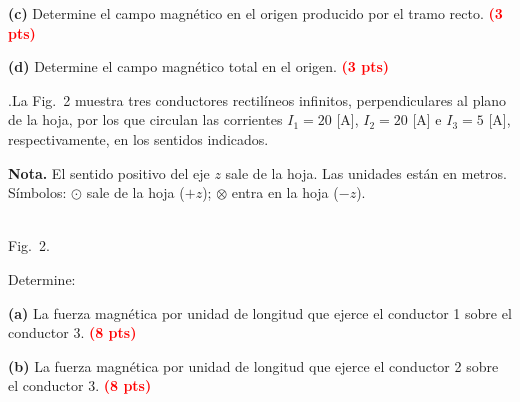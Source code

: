 \documentclass[addpoints,12pt]{exam}
\newcommand{\qpts}[1]{{\setlength{\fboxsep}{2.5pt}\fbox{#1}}\hspace{0.6em}\ignorespaces}
\newcommand{\qhead}[1]{\thequestion.\hspace{0.5em}\qpts{#1}}
\newcommand{\pts}[1]{\textcolor{red}{\textbf{(#1 pts)}}}
\newcommand{\isale}[1]{%
  \draw[ubbblue,line width=1.4pt,fill=white] (#1) circle (0.2);
  \fill[ubbblue] (#1) circle (0.075);}
\newcommand{\ientra}[1]{%
  \draw[ubbblue,line width=1.4pt,fill=white] (#1) circle (0.2);
  \draw[ubbblue,line width=1.4pt] ($(#1)+(-0.13,-0.13)$)--($(#1)+(0.13,0.13)$)
        ($(#1)+(-0.13,0.13)$)--($(#1)+(0.13,-0.13)$);}
\begin{document}
\begin{questions}
\vspace{7.5cm}
\noindent\textbf{(c)} Determine el campo magn\'etico en el origen producido por el tramo recto.
\pts{3}

\vspace{3.5cm}
\noindent\textbf{(d)} Determine el campo magn\'etico total en el origen. \pts{3}

\newpage

\question[20]
\begin{minipage}[t]{0.56\textwidth}
\vspace{0pt}
\qhead{20}La Fig.~2 muestra
tres conductores rectil\'ineos infinitos, perpendiculares al plano de la hoja, por los que circulan
las corrientes $I_1 = 20$ [A], $I_2 = 20$ [A] e $I_3 = 5$ [A], respectivamente, en los sentidos indicados.

\smallskip
\noindent\textbf{Nota.} El sentido positivo del eje $z$ sale de la hoja. Las unidades est\'an en
metros. S\'imbolos: $\odot$ sale de la hoja ($+z$); $\otimes$ entra en la hoja ($-z$).
\end{minipage}\hfill
\begin{minipage}[t]{0.40\textwidth}
\vspace{0pt}
\centering
{}
\\[2pt]
{\footnotesize Fig.\ 2.}
\end{minipage}

\medskip
\noindent Determine:

\smallskip
\noindent\textbf{(a)} La fuerza magn\'etica por unidad de longitud que ejerce el conductor 1 sobre el
conductor 3. \pts{8}

\vspace{6.5cm}
\noindent\textbf{(b)} La fuerza magn\'etica por unidad de longitud que ejerce el conductor 2 sobre el
conductor 3. \pts{8}


\end{questions}
\end{document}
